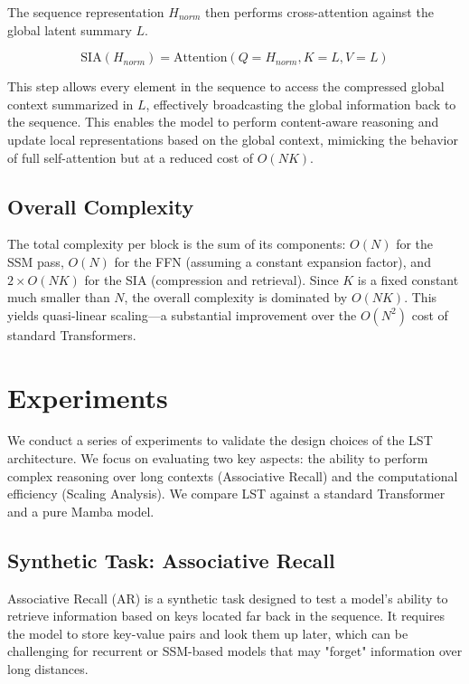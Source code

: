 \documentclass[10pt,twocolumn,letterpaper]{article}
\begin{document}
The sequence representation \(H_{norm}\) then performs cross-attention against the global latent summary \(L\).

\begin{equation}
\text{SIA}(H_{norm}) = \text{Attention}(Q=H_{norm}, K=L, V=L)
\end{equation}

This step allows every element in the sequence to access the compressed global context summarized in \(L\), effectively broadcasting the global information back to the sequence. This enables the model to perform content-aware reasoning and update local representations based on the global context, mimicking the behavior of full self-attention but at a reduced cost of \(O(NK)\).

\subsection{Overall Complexity}

The total complexity per block is the sum of its components: \(O(N)\) for the SSM pass, \(O(N)\) for the FFN (assuming a constant expansion factor), and \(2\times O(NK)\) for the SIA (compression and retrieval). Since \(K\) is a fixed constant much smaller than \(N\), the overall complexity is dominated by \(O(NK)\). This yields quasi-linear scaling—a substantial improvement over the \(O(N^{2})\) cost of standard Transformers.

\section{Experiments}

We conduct a series of experiments to validate the design choices of the LST architecture. We focus on evaluating two key aspects: the ability to perform complex reasoning over long contexts (Associative Recall) and the computational efficiency (Scaling Analysis). We compare LST against a standard Transformer and a pure Mamba model.

\subsection{Synthetic Task: Associative Recall}

Associative Recall (AR) is a synthetic task designed to test a model's ability to retrieve information based on keys located far back in the sequence. It requires the model to store key-value pairs and look them up later, which can be challenging for recurrent or SSM-based models that may "forget" information over long distances.
\end{document}
